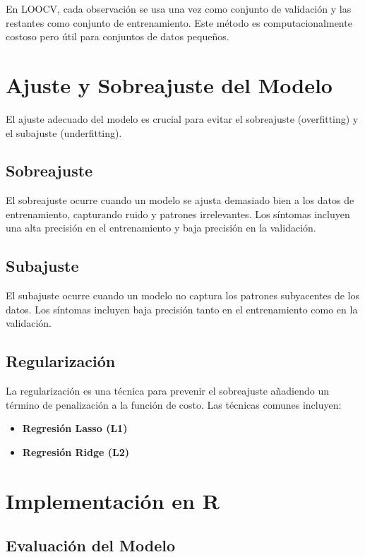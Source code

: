 \documentclass[a4paper]{report} %
\begin{document}
En LOOCV, cada observaci\'on se usa una vez como conjunto de validaci\'on y las restantes como conjunto de entrenamiento. Este m\'etodo es computacionalmente costoso pero \'util para conjuntos de datos peque\~nos.

\section{Ajuste y Sobreajuste del Modelo}

El ajuste adecuado del modelo es crucial para evitar el sobreajuste (overfitting) y el subajuste (underfitting).

\subsection{Sobreajuste}

El sobreajuste ocurre cuando un modelo se ajusta demasiado bien a los datos de entrenamiento, capturando ruido y patrones irrelevantes. Los s\'intomas incluyen una alta precisi\'on en el entrenamiento y baja precisi\'on en la validaci\'on.

\subsection{Subajuste}

El subajuste ocurre cuando un modelo no captura los patrones subyacentes de los datos. Los s\'intomas incluyen baja precisi\'on tanto en el entrenamiento como en la validaci\'on.

\subsection{Regularizaci\'on}

La regularizaci\'on es una t\'ecnica para prevenir el sobreajuste a\~nadiendo un t\'ermino de penalizaci\'on a la funci\'on de costo. Las t\'ecnicas comunes incluyen:
\begin{itemize}
    \item \textbf{Regresi\'on Lasso (L1)}
    \item \textbf{Regresi\'on Ridge (L2)}
\end{itemize}

\section{Implementaci\'on en R}

\subsection{Evaluaci\'on del Modelo}
\end{document}
